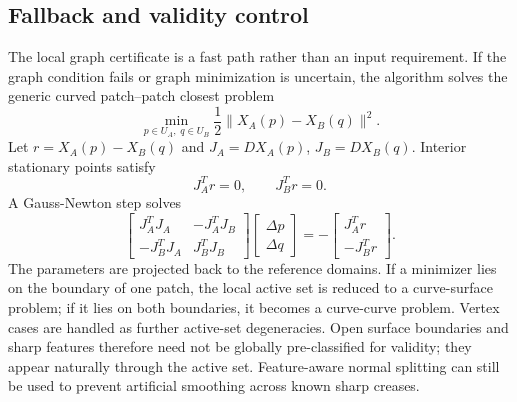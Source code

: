 \documentclass[preprint,12pt]{elsarticle}
\begin{document}
\subsection{Fallback and validity control}
\label{subsec:patch_pair_fallback}

The local graph certificate is a fast path rather than an input requirement. If the graph condition fails or graph minimization is uncertain, the algorithm solves the generic curved patch--patch closest problem
\begin{equation}
    \min_{p\in U_A,\;q\in U_B}\frac{1}{2}\|X_A(p)-X_B(q)\|^2.
    \label{eq:patch_patch}
\end{equation}
Let $r=X_A(p)-X_B(q)$ and $J_A=DX_A(p)$, $J_B=DX_B(q)$. Interior stationary points satisfy
\begin{equation}
    J_A^T r=0,
    \qquad
    J_B^T r=0.
    \label{eq:stationarity_patch}
\end{equation}
A Gauss-Newton step solves
\begin{equation}
    \begin{bmatrix}
    J_A^TJ_A & -J_A^TJ_B\\
    -J_B^TJ_A & J_B^TJ_B
    \end{bmatrix}
    \begin{bmatrix}\Delta p\\ \Delta q\end{bmatrix}
    =-
    \begin{bmatrix}J_A^T r\\ -J_B^T r\end{bmatrix}.
    \label{eq:gn_patch}
\end{equation}
The parameters are projected back to the reference domains. If a minimizer lies on the boundary of one patch, the local active set is reduced to a curve-surface problem; if it lies on both boundaries, it becomes a curve-curve problem. Vertex cases are handled as further active-set degeneracies. Open surface boundaries and sharp features therefore need not be globally pre-classified for validity; they appear naturally through the active set. Feature-aware normal splitting can still be used to prevent artificial smoothing across known sharp creases.
\end{document}
